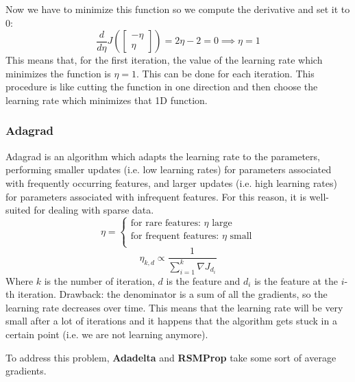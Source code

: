 Now we have to minimize this function so we compute the derivative and set it to 0:
\[
    \dfrac{d}{d\eta} J\left(  
        \begin{bmatrix}
            -\eta\\
            \eta
        \end{bmatrix}
        \right) = 2\eta - 2 = 0 \implies \eta = 1
\]
This means that, for the first iteration, the value of the learning rate which minimizes the function is $\eta = 1$. This can be done for each iteration. 
This procedure is like cutting the function in one direction and then choose the learning rate which minimizes that 1D function. 


\subsubsection{Adagrad}
Adagrad is an algorithm which adapts the learning rate to the parameters, performing smaller updates (i.e. low learning rates) for parameters associated with frequently occurring features, and larger updates (i.e. high learning rates) for parameters associated with infrequent features. For this reason, it is well-suited for dealing with sparse data.\\

\[
    \eta = \begin{cases}
        \text{for rare features: } \eta \text{ large}\\
        \text{for frequent features: } \eta \text{ small}\\
    \end{cases}
\]
\[
    \eta_{k,d} \propto \dfrac{1}{\sum_{i=1}^k \nabla J_{d_i}}    
\]
Where $k$ is the number of iteration, $d$ is the feature and $d_i$ is the feature at the $i$-th iteration. Drawback: the denominator is a sum of all the gradients, so the learning rate decreases over time. This means that the learning rate will be very small after a lot of iterations and it happens that the algorithm gets stuck in a certain point (i.e. we are not learning anymore).

To address this problem, \textbf{Adadelta} and \textbf{RSMProp} take some sort of average gradients.
